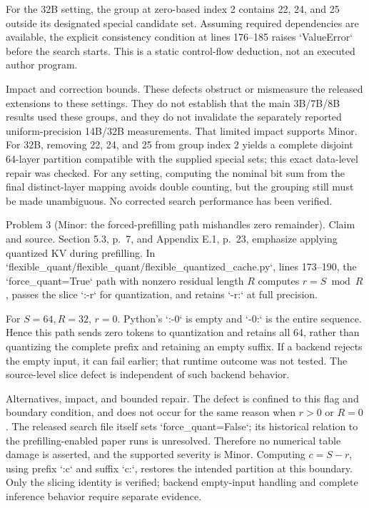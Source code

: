 \documentclass[10pt]{article}
\begin{document}
For the 32B setting, the group at zero-based index 2 contains 22, 24, and 25 outside its designated special candidate set. Assuming required dependencies are available, the explicit consistency condition at lines 176–185 raises `ValueError` before the search starts. This is a static control-flow deduction, not an executed author program.\par
Impact and correction bounds. These defects obstruct or mismeasure the released extensions to these settings. They do not establish that the main 3B/7B/8B results used these groups, and they do not invalidate the separately reported uniform-precision 14B/32B measurements. That limited impact supports Minor. For 32B, removing 22, 24, and 25 from group index 2 yields a complete disjoint 64-layer partition compatible with the supplied special sets; this exact data-level repair was checked. For any setting, computing the nominal bit sum from the final distinct-layer mapping avoids double counting, but the grouping still must be made unambiguous. No corrected search performance has been verified.\par
Problem 3 (Minor: the forced-prefilling path mishandles zero remainder).  Claim and source. Section 5.3, p. 7, and Appendix E.1, p. 23, emphasize applying quantized KV during prefilling. In `flexible\_quant/flexible\_quant/flexible\_quantized\_cache.py`, lines 173–190, the `force\_quant=True` path with nonzero residual length \(R\) computes \(r=S\bmod R\), passes the slice `:-r` for quantization, and retains `-r:` at full precision.\par
For \(S=64,R=32\), \(r=0\). Python’s `:-0` is empty and `-0:` is the entire sequence. Hence this path sends zero tokens to quantization and retains all 64, rather than quantizing the complete prefix and retaining an empty suffix. If a backend rejects the empty input, it can fail earlier; that runtime outcome was not tested. The source-level slice defect is independent of such backend behavior.\par
Alternatives, impact, and bounded repair. The defect is confined to this flag and boundary condition, and does not occur for the same reason when \(r>0\) or \(R=0\). The released search file itself sets `force\_quant=False`; its historical relation to the prefilling-enabled paper runs is unresolved. Therefore no numerical table damage is asserted, and the supported severity is Minor. Computing \(c=S-r\), using prefix `:c` and suffix `c:`, restores the intended partition at this boundary. Only the slicing identity is verified; backend empty-input handling and complete inference behavior require separate evidence.\par
\end{document}
